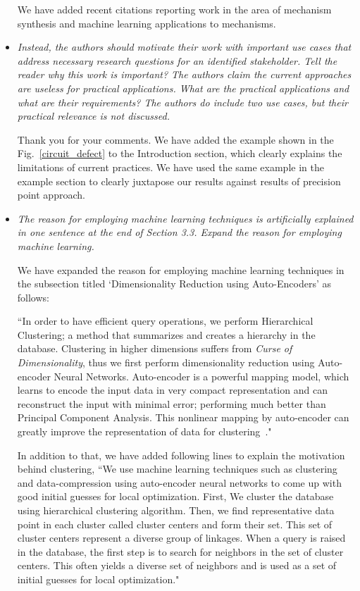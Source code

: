 \documentclass{article}
\begin{document}
\begin{itemize}
We have added recent citations reporting work in the area of mechanism synthesis and machine learning applications to mechanisms.
\\

  \item \emph{
Instead, the authors should motivate their work with important use cases that address necessary research questions for an identified stakeholder. Tell the reader why this work is important? The authors claim the current approaches are useless for practical applications. What are the practical applications and what are their requirements? The authors do include two use cases, but their practical relevance is not discussed.
}

Thank you for your comments.
We have added the example shown in the Fig.~\ref{circuit_defect} to the Introduction section, which clearly explains the limitations of current practices.
We have used the same example in the example section to clearly juxtapose our results against results of precision point approach.
\\

  \item \emph{
 The reason for employing machine learning techniques is artificially explained in one sentence at the end of Section 3.3. Expand the reason for employing machine learning.
}

We have expanded the reason for employing machine learning techniques in the subsection titled `Dimensionality Reduction using Auto-Encoders' as follows:

``In order to have efficient query operations, we perform Hierarchical Clustering; a method that summarizes and creates a hierarchy in the database.
Clustering in higher dimensions suffers from \emph{Curse of Dimensionality}\cite{marimont1979}, thus we first perform dimensionality reduction using Auto-encoder Neural Networks.
Auto-encoder is a powerful mapping model, which learns to encode the input data in very compact representation and can reconstruct the input with minimal error; performing much better than Principal Component Analysis\cite{hinton2006}.
This nonlinear mapping by auto-encoder can greatly improve the representation of data for clustering~\cite{song2013}."

In addition to that, we have added following lines to explain the motivation behind clustering,
``We use machine learning techniques such as clustering and data-compression using auto-encoder neural networks to come up with good initial guesses for local optimization.
First, We cluster the database using hierarchical clustering algorithm.
Then, we find representative data point in each cluster called cluster centers and form their set.
This set of cluster centers represent a diverse group of linkages.
When a query is raised in the database, the first step is to search for neighbors in the set of cluster centers.
This often yields a diverse set of neighbors and is used as a set of initial guesses for local optimization."\\


\end{itemize}
\end{document}

